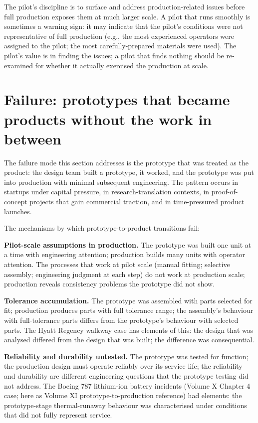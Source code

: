 The pilot's discipline is to surface and address production-related issues before full production exposes them at much larger scale. A pilot that runs smoothly is sometimes a warning sign: it may indicate that the pilot's conditions were not representative of full production (e.g., the most experienced operators were assigned to the pilot; the most carefully-prepared materials were used). The pilot's value is in finding the issues; a pilot that finds nothing should be re-examined for whether it actually exercised the production at scale.

\section{Failure: prototypes that became products without the work in between}

The failure mode this section addresses is the prototype that was treated as the product: the design team built a prototype, it worked, and the prototype was put into production with minimal subsequent engineering. The pattern occurs in startups under capital pressure, in research-translation contexts, in proof-of-concept projects that gain commercial traction, and in time-pressured product launches.

The mechanisms by which prototype-to-product transitions fail:

\textbf{Pilot-scale assumptions in production.} The prototype was built one unit at a time with engineering attention; production builds many units with operator attention. The processes that work at pilot scale (manual fitting; selective assembly; engineering judgment at each step) do not work at production scale; production reveals consistency problems the prototype did not show.

\textbf{Tolerance accumulation.} The prototype was assembled with parts selected for fit; production produces parts with full tolerance range; the assembly's behaviour with full-tolerance parts differs from the prototype's behaviour with selected parts. The Hyatt Regency walkway case has elements of this: the design that was analysed differed from the design that was built; the difference was consequential.

\textbf{Reliability and durability untested.} The prototype was tested for function; the production design must operate reliably over its service life; the reliability and durability are different engineering questions that the prototype testing did not address. The Boeing 787 lithium-ion battery incidents (Volume X Chapter 4 case; here as Volume XI prototype-to-production reference) had elements: the prototype-stage thermal-runaway behaviour was characterised under conditions that did not fully represent service.

